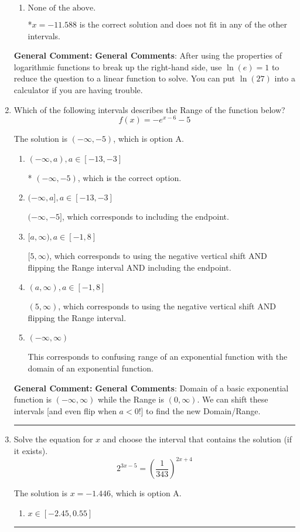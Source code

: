 \documentclass{extbook}[14pt]
\newcommand{\litem}[1]{\item #1

\rule{\textwidth}{0.4pt}}
\begin{document}
\begin{enumerate}
{\begin{enumerate}[label=\Alph*.]
This corresponds to believing you cannot solve the equation.
\item \( \text{None of the above.} \)

*$x = -11.588$ is the correct solution and does not fit in any of the other intervals.
\end{enumerate}

\textbf{General Comment:} \textbf{General Comments}: After using the properties of logarithmic functions to break up the right-hand side, use $\ln(e) = 1$ to reduce the question to a linear function to solve. You can put $\ln(27)$ into a calculator if you are having trouble.
}
\litem{
Which of the following intervals describes the Range of the function below?
\[ f(x) = -e^{x-6}-5 \]

The solution is \( (-\infty, -5) \), which is option A.\begin{enumerate}[label=\Alph*.]
\item \( (-\infty, a), a \in [-13, -3] \)

* $(-\infty, -5)$, which is the correct option.
\item \( (-\infty, a], a \in [-13, -3] \)

$(-\infty, -5]$, which corresponds to including the endpoint.
\item \( [a, \infty), a \in [-1, 8] \)

$[5, \infty)$, which corresponds to using the negative vertical shift AND flipping the Range interval AND including the endpoint.
\item \( (a, \infty), a \in [-1, 8] \)

$(5, \infty)$, which corresponds to using the negative vertical shift AND flipping the Range interval.
\item \( (-\infty, \infty) \)

This corresponds to confusing range of an exponential function with the domain of an exponential function.
\end{enumerate}

\textbf{General Comment:} \textbf{General Comments}: Domain of a basic exponential function is $(-\infty, \infty)$ while the Range is $(0, \infty)$. We can shift these intervals [and even flip when $a<0$!] to find the new Domain/Range.
}
\litem{
Solve the equation for $x$ and choose the interval that contains the solution (if it exists).
\[ 2^{3x-5} = \left(\frac{1}{343}\right)^{2x+4} \]

The solution is \( x = -1.446 \), which is option A.\begin{enumerate}[label=\Alph*.]
\item \( x \in [-2.45, 0.55] \)


\end{enumerate}}
\end{enumerate}
\end{document}
